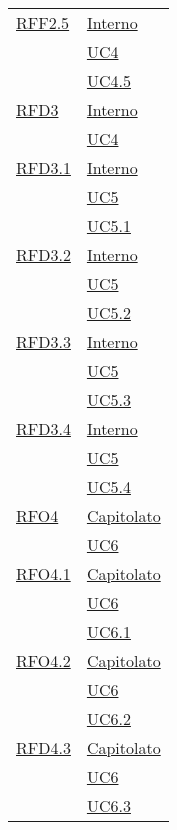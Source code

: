 \begin{longtable}{|>{\centering}m{5cm}|m{5cm}<{\centering}|}
\hyperlink{RFF2.5}{RFF2.5} & \hyperlink{Interno}{Interno}\\
& \hyperref[UC4]{UC4}\\
& \hyperref[UC4.5]{UC4.5}\\ \hline

\hyperlink{RFD3}{RFD3} & \hyperlink{Interno}{Interno}\\
& \hyperref[UC4]{UC4}\\ \hline

\hyperlink{RFD3.1}{RFD3.1} & \hyperlink{Interno}{Interno}\\
& \hyperref[UC5]{UC5}\\
& \hyperref[UC5.1]{UC5.1}\\ \hline

\hyperlink{RFD3.2}{RFD3.2} & \hyperlink{Interno}{Interno}\\
& \hyperref[UC5]{UC5}\\
& \hyperref[UC5.2]{UC5.2}\\ \hline

\hyperlink{RFD3.3}{RFD3.3} & \hyperlink{Interno}{Interno}\\
& \hyperref[UC5]{UC5}\\
& \hyperref[UC5.3]{UC5.3}\\ \hline

\hyperlink{RFD3.4}{RFD3.4} & \hyperlink{Interno}{Interno}\\
& \hyperref[UC5]{UC5}\\
& \hyperref[UC5.4]{UC5.4}\\ \hline

\hyperlink{RFO4}{RFO4} & \hyperlink{Capitolato}{Capitolato}\\
& \hyperref[UC6]{UC6}\\ \hline

\hyperlink{RFO4.1}{RFO4.1} & \hyperlink{Capitolato}{Capitolato}\\
& \hyperref[UC6]{UC6}\\
& \hyperref[UC6.1]{UC6.1}\\ \hline

\hyperlink{RFO4.2}{RFO4.2} & \hyperlink{Capitolato}{Capitolato}\\
& \hyperref[UC6]{UC6}\\
& \hyperref[UC6.2]{UC6.2}\\ \hline

\hyperlink{RFD4.3}{RFD4.3} & \hyperlink{Capitolato}{Capitolato}\\
& \hyperref[UC6]{UC6}\\
& \hyperref[UC6.3]{UC6.3}\\ \hline



\end{longtable}
